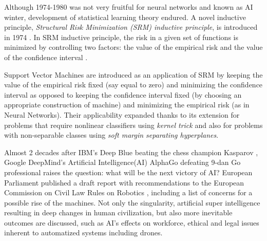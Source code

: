Although 1974-1980 was not very fruitful for neural networks and known as AI winter, development of statistical learning theory endured.  A novel inductive principle, \emph{Structural Risk Minimization (SRM) inductive principle}, is introduced in 1974 \cite{vapnik1974theory}. 
In SRM inductive principle, the risk in a given set of functions is minimized by controlling two factors: the value of the empirical risk and the value of the confidence interval \cite{vapnik2013nature}. 

Support Vector Machines \cite{vapnik1974theory,vapnik2006estimation} are introduced as an application of SRM by keeping the value of the empirical risk fixed (say equal to zero) and minimizing the confidence interval \cite{vapnik2013nature} as opposed to keeping the confidence interval fixed (by choosing an appropriate construction of machine) and minimizing the empirical risk (as in Neural Networks). 
Their applicability expanded thanks to its extension for problems that require nonlinear classifiers \cite{boser1992training} using \emph{kernel trick} \cite{aizerman1964theoretical} and also for problems with non-separable classes \cite{cortes1995support} using \emph{soft margin separating hyperplanes}. 


Almost 2 decades after IBM's Deep Blue beating the chess champion Kasparov \cite{deepBlue}, Google DeepMind's Artificial Intelligence(AI) AlphaGo \cite{alphaGoDeepMind,alphaGo} defeating 9-dan Go professional raises the question: what will be the next victory of AI?
European Parliament published a draft report with recommendations to the European Commission on Civil Law Rules on Robotics \cite{delvaux2017report}, including a list of concerns for a possible rise of the machines. 
Not only the singularity, artificial super intelligence resulting in deep changes in human civilization, but also more inevitable outcomes are discussed, such as AI's effects on workforce, ethical and legal issues inherent to automatized systems including drones.

